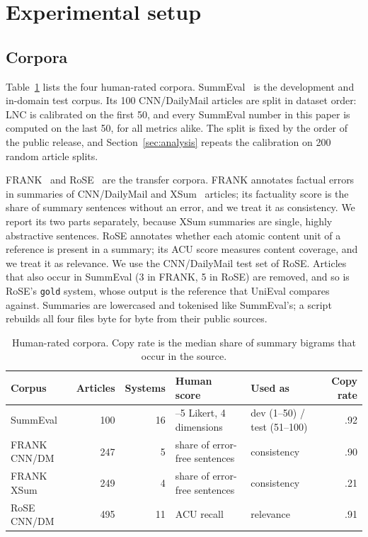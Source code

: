 \section{Experimental setup}
\label{sec:setup}

\subsection{Corpora}

Table~\ref{tab:corpora} lists the four human-rated corpora. SummEval~\citep{fabbri2021summeval} is the development and in-domain test corpus. Its 100 CNN/DailyMail articles are split in dataset order: LNC is calibrated on the first 50, and every SummEval number in this paper is computed on the last 50, for all metrics alike. The split is fixed by the order of the public release, and Section~\ref{sec:analysis} repeats the calibration on 200 random article splits.

FRANK~\citep{pagnoni2021frank} and RoSE~\citep{liu2023rose} are the transfer corpora. FRANK annotates factual errors in summaries of CNN/DailyMail and XSum~\citep{narayan2018xsum} articles; its factuality score is the share of summary sentences without an error, and we treat it as consistency. We report its two parts separately, because XSum summaries are single, highly abstractive sentences. RoSE annotates whether each atomic content unit of a reference is present in a summary; its ACU score measures content coverage, and we treat it as relevance. We use the CNN/DailyMail test set of RoSE. Articles that also occur in SummEval (3 in FRANK, 5 in RoSE) are removed, and so is RoSE's \texttt{gold} system, whose output is the reference that UniEval compares against. Summaries are lowercased and tokenised like SummEval's; a script rebuilds all four files byte for byte from their public sources.

\begin{table}[t]
\centering
\caption{Human-rated corpora. Copy rate is the median share of summary bigrams that occur in the source.}
\label{tab:corpora}
\small
\begin{tabular}{@{}lrr>{\raggedright\arraybackslash}p{3.4cm}>{\raggedright\arraybackslash}p{3.6cm}r@{}}
\toprule
Corpus & Articles & Systems & Human score & Used as & Copy rate \\
\midrule
SummEval & 100 & 16 & 1--5 Likert, 4 dimensions & dev (1--50) / test (51--100) & .92 \\
FRANK CNN/DM & 247 & 5 & share of error-free sentences & consistency & .90 \\
FRANK XSum & 249 & 4 & share of error-free sentences & consistency & .21 \\
RoSE CNN/DM & 495 & 11 & ACU recall & relevance & .91 \\
\bottomrule
\end{tabular}
\end{table}


